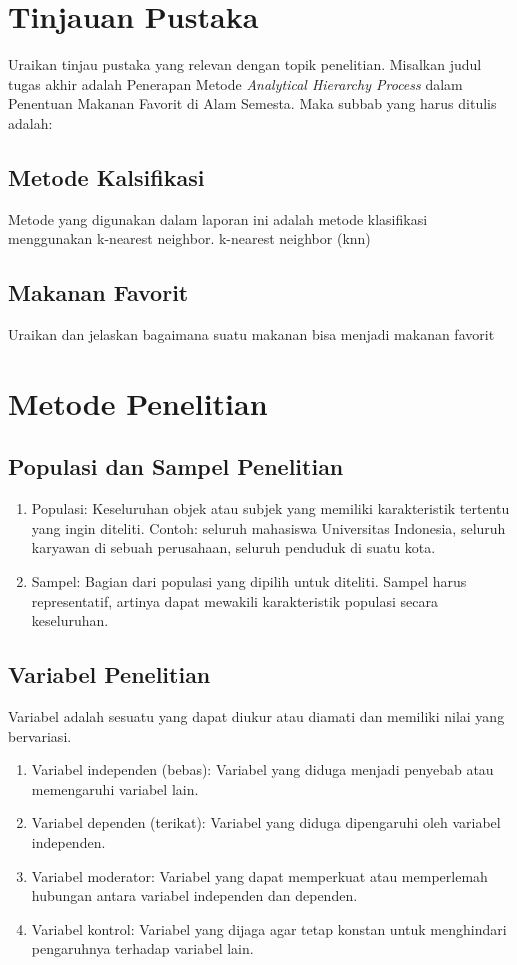 \documentclass[english,12pt,a4paper]{book}
\begin{document}
\chapter{Tinjauan Pustaka}
Uraikan tinjau pustaka yang relevan dengan topik penelitian. Misalkan judul tugas akhir adalah Penerapan Metode \textit{Analytical Hierarchy Process} dalam Penentuan Makanan Favorit di Alam Semesta. Maka subbab yang harus ditulis adalah:
\section{Metode Kalsifikasi}
Metode yang digunakan dalam laporan ini adalah metode klasifikasi menggunakan k-nearest neighbor. k-nearest neighbor (knn)
\section{Makanan Favorit}
Uraikan dan jelaskan bagaimana suatu makanan bisa menjadi makanan favorit

\chapter{Metode Penelitian} 
\section{Populasi dan Sampel Penelitian}
\begin{enumerate}
	\item Populasi: Keseluruhan objek atau subjek yang memiliki karakteristik tertentu yang ingin diteliti. Contoh: seluruh mahasiswa Universitas Indonesia, seluruh karyawan di sebuah perusahaan, seluruh penduduk di suatu kota.
	\item Sampel: Bagian dari populasi yang dipilih untuk diteliti. Sampel harus representatif, artinya dapat mewakili karakteristik populasi secara keseluruhan.
\end{enumerate}
\section{Variabel Penelitian}
Variabel adalah sesuatu yang dapat diukur atau diamati dan memiliki nilai yang bervariasi.
\begin{enumerate}
	\item Variabel independen (bebas): Variabel yang diduga menjadi penyebab atau memengaruhi variabel lain.
	\item Variabel dependen (terikat): Variabel yang diduga dipengaruhi oleh variabel independen.
	\item Variabel moderator: Variabel yang dapat memperkuat atau memperlemah hubungan antara variabel independen dan dependen.
	\item Variabel kontrol: Variabel yang dijaga agar tetap konstan untuk menghindari pengaruhnya terhadap variabel lain.
\end{enumerate}
\end{document}
